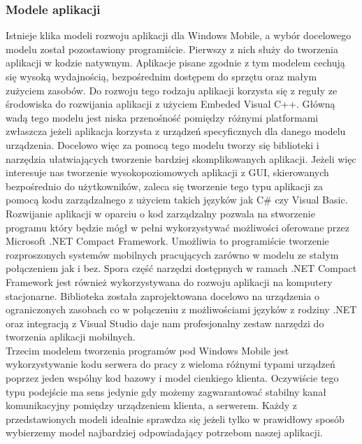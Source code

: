 \subsubsection{Modele aplikacji}
Istnieje klika modeli rozwoju aplikacji dla Windows Mobile, a wybór docelowego
modelu został pozostawiony programiście. Pierwszy z nich służy do tworzenia
aplikacji w kodzie natywnym. Aplikacje pisane zgodnie z tym modelem cechują się
wysoką wydajnością, bezpośrednim dostępem do sprzętu oraz małym zużyciem
zasobów. Do rozwoju tego rodzaju aplikacji korzysta się z reguły ze środowiska do
rozwijania aplikacji z użyciem Embeded Visual C++. Główną wadą tego modelu jest
niska przenośność pomiędzy różnymi platformami zwłaszcza jeżeli aplikacja
korzysta z urządzeń specyficznych dla danego modelu urządzenia. Docelowo więc za
pomocą tego modelu tworzy się biblioteki i narzędzia ułatwiających tworzenie
bardziej skomplikowanych aplikacji. Jeżeli więc interesuje nas tworzenie
wysokopoziomowych aplikacji z GUI, skierowanych bezpośrednio do użytkowników,
zaleca się tworzenie tego typu aplikacji za pomocą kodu zarządzalnego z użyciem
takich języków jak C\# czy Visual Basic. Rozwijanie aplikacji w oparciu o kod
zarządzalny pozwala na stworzenie programu który będzie mógł w pełni
wykorzystywać możliwości oferowane przez Microsoft .NET Compact Framework.
Umożliwia to programiście tworzenie rozproszonych systemów mobilnych pracujących
zarówno w modelu ze stałym połączeniem jak i bez. Spora część narzędzi
dostępnych w ramach .NET Compact Framework jest również wykorzystywana do rozwoju
aplikacji na komputery stacjonarne. Biblioteka została zaprojektowana docelowo na
urządzenia o ograniczonych zasobach co w połączeniu z możliwościami języków z
rodziny .NET oraz integracją z Visual Studio daje nam profesjonalny zestaw
narzędzi do tworzenia aplikacji mobilnych.
\\
Trzecim modelem tworzenia programów pod Windows Mobile jest wykorzystywanie kodu
serwera do pracy z wieloma różnymi typami urządzeń poprzez jeden wspólny kod
bazowy i model cienkiego klienta. Oczywiście tego typu podejście ma sens jedynie
gdy możemy zagwarantować stabilny kanał komunikacyjny pomiędzy urządzeniem
klienta, a serwerem. Każdy z przedstawionych modeli idealnie sprawdza się jeżeli
tylko w prawidłowy sposób wybierzemy model najbardziej odpowiadający potrzebom
naszej aplikacji.

